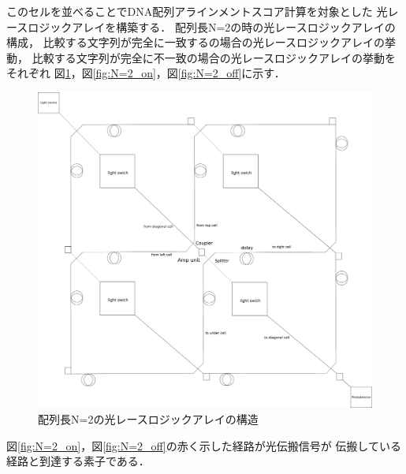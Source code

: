 このセルを並べることでDNA配列アラインメントスコア計算を対象とした
光レースロジックアレイを構築する．
配列長N=2の時の光レースロジックアレイの構成，
比較する文字列が完全に一致するの場合の光レースロジックアレイの挙動，
比較する文字列が完全に不一致の場合の光レースロジックアレイの挙動をそれぞれ
図\ref{fig:N=2}，図\ref{fig:N=2_on}，図\ref{fig:N=2_off}に示す．
\begin{figure}[t!]
\begin{center}
\includegraphics[keepaspectratio,scale=0.35]{fig/3/lightracelogic_N_2.png}
\caption{配列長N=2の光レースロジックアレイの構造}
\label{fig:N=2}
\end{center}
\end{figure}
図\ref{fig:N=2_on}，図\ref{fig:N=2_off}の赤く示した経路が光伝搬信号が
伝搬している経路と到達する素子である．

